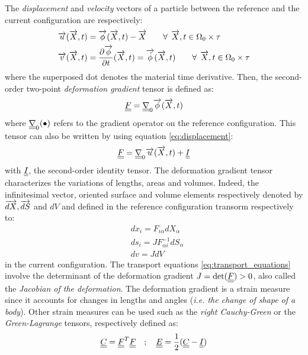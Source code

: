 The \textit{displacement} and \textit{velocity} vectors of a particle between the reference and the current configuration are respectively:
\begin{align}
    &{\overrightarrow{u}}({\overrightarrow{X}},t)={\overrightarrow{\phi}}({\overrightarrow{X}},t) - {\overrightarrow{X}} \qquad \forall\:\: {\overrightarrow{X}},t \in \Omega_0\times \tau  \label{eq:displacement}\\
    &{\overrightarrow{v}}({\overrightarrow{X}},t)=\frac{\partial {\overrightarrow{\phi}}}{\partial t}({\overrightarrow{X}},t) = {\overrightarrow{\dot{\phi}}}({\overrightarrow{X}},t) \qquad  \forall\: \: {\overrightarrow{X}},t \in \Omega_0\times \tau  \label{eq:velocity}
\end{align}
where the superposed dot denotes the material time derivative. Then, the second-order two-point \textit{deformation gradient} tensor is defined as:
\begin{equation}
  \label{eq:F_phi}
    {\underline{\underline{F}}}={\underline{\underline{\nabla}}}_0 {\overrightarrow{\phi}} ({\overrightarrow{X}},t)
\end{equation}
where ${\underline{\underline{\nabla}}}_0 (\bullet)$ refers to the gradient operator on the reference configuration. This tensor can also be written by using equation \eqref{eq:displacement}:
\begin{equation}
  {\underline{\underline{F}}}= {\underline{\underline{\nabla}}}_0 {\overrightarrow{u}}({\overrightarrow{X}},t) + {\underline{\underline{I}}} \label{eq:F_displacement}
\end{equation}
with ${\underline{\underline{I}}}$, the second-order identity tensor. The deformation gradient tensor characterizes the variations of lengths, areas and volumes. Indeed, the infinitesimal vector, oriented surface and volume elements respectively denoted by ${\overrightarrow{dX}},{\overrightarrow{dS}}$ and $dV$ and defined in the reference configuration transorm respectively to:
\begin{equation}
  \label{eq:transport_equations}
  \begin{aligned}
    & dx_i=F_{i\alpha}dX_\alpha \\
    & ds_i=J F_{\alpha i}^{-1}dS_{\alpha} \\
    & dv=JdV 
  \end{aligned}
\end{equation}
in the current configuration. The transport equations \eqref{eq:transport_equations} involve the determinant of the deformation gradient $J=\det({\underline{\underline{F}}})>0$, also called the \textit{Jacobian of the deformation}. The deformation gradient is a strain measure since it accounts for changes in lengths and angles (\textit{i.e. the change of shape of a body}). Other strain measures can be used such as the \textit{right Cauchy-Green} or the \textit{Green-Lagrange} tensors, respectively defined as:
\begin{equation*}
   {\underline{\underline{C}}}={\underline{\underline{F}}}^T{\underline{\underline{F}}} \quad ; \quad {\underline{\underline{E}}}=\frac{1}{2}({\underline{\underline{C}}}-{\underline{\underline{I}}})
\end{equation*}
